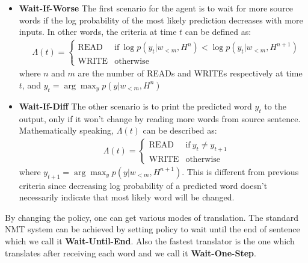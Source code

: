 \documentclass{sfuthesis}
\begin{document}
\begin{itemize}
    \item \textbf{Wait-If-Worse}
    The first scenario for the agent is to wait for more source words if the log probability of the most likely prediction decreases with more inputs. In other words, the criteria at time $t$ can be defined as:
    \begin{align*}
        &\Lambda(t) = 
        \begin{cases}
        \text{READ} & \text{if} \ \log p(y_t|w_{<{m}}, H^n) < \log p(y_t|w_{<{m}}, H^{n+1})\\
        \text{WRITE} & \text{otherwise}
        \end{cases}
    \end{align*}
    where $n$ and $m$ are the number of READs and WRITEs respectively at time $t$, and $y_t = \arg \max_y p(y|w_{<m}, H^{n}) $
    
    \item \textbf{Wait-If-Diff}
    The other scenario is to print the predicted word $y_t$ to the output, only if it won't change by reading more words from source sentence. Mathematically speaking, $\Lambda(t)$ can be described as:
    \begin{align*}
        &\Lambda(t) = 
        \begin{cases}
        \text{READ} & \text{if} \ y_t \neq y_{t+1}\\
        \text{WRITE} & \text{otherwise}
        \end{cases}
    \end{align*}
    where $y_{t+1} = \arg \max_y p(y|w_{<m}, H^{n+1}) $. This is different from previous criteria since decreasing log probability of a predicted word doesn't necessarily indicate that most likely word will be changed. 
\end{itemize}

By changing the policy, one can get various modes of translation. The standard NMT system can be achieved by setting policy to wait until the end of sentence which we call it \textbf{Wait-Until-End}. Also the fastest translator is the one which translates after receiving each word and we call it \textbf{Wait-One-Step}. 
\end{document}
